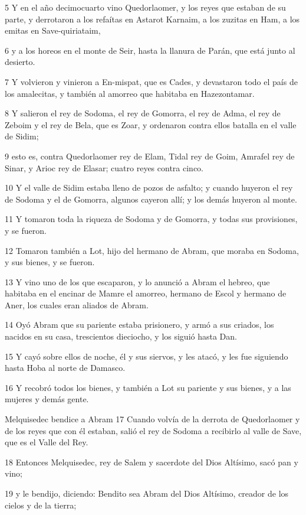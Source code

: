 5 Y en el año decimocuarto vino Quedorlaomer, y los reyes que estaban de su parte, y derrotaron a los refaítas en Astarot Karnaim, a los zuzitas en Ham, a los emitas en Save-quiriataim,

6 y a los horeos en el monte de Seir, hasta la llanura de Parán, que está junto al desierto.

7 Y volvieron y vinieron a En-mispat, que es Cades, y devastaron todo el país de los amalecitas, y también al amorreo que habitaba en Hazezontamar.

8 Y salieron el rey de Sodoma, el rey de Gomorra, el rey de Adma, el rey de Zeboim y el rey de Bela, que es Zoar, y ordenaron contra ellos batalla en el valle de Sidim;

9 esto es, contra Quedorlaomer rey de Elam, Tidal rey de Goim, Amrafel rey de Sinar, y Arioc rey de Elasar; cuatro reyes contra cinco.

10 Y el valle de Sidim estaba lleno de pozos de asfalto; y cuando huyeron el rey de Sodoma y el de Gomorra, algunos cayeron allí; y los demás huyeron al monte.

11 Y tomaron toda la riqueza de Sodoma y de Gomorra, y todas sus provisiones, y se fueron.

12 Tomaron también a Lot, hijo del hermano de Abram, que moraba en Sodoma, y sus bienes, y se fueron.

13 Y vino uno de los que escaparon, y lo anunció a Abram el hebreo, que habitaba en el encinar de Mamre el amorreo, hermano de Escol y hermano de Aner, los cuales eran aliados de Abram.

14 Oyó Abram que su pariente estaba prisionero, y armó a sus criados, los nacidos en su casa, trescientos dieciocho, y los siguió hasta Dan.

15 Y cayó sobre ellos de noche, él y sus siervos, y les atacó, y les fue siguiendo hasta Hoba al norte de Damasco.

16 Y recobró todos los bienes, y también a Lot su pariente y sus bienes, y a las mujeres y demás gente.

Melquisedec bendice a Abram
17 Cuando volvía de la derrota de Quedorlaomer y de los reyes que con él estaban, salió el rey de Sodoma a recibirlo al valle de Save, que es el Valle del Rey.

18 Entonces Melquisedec, rey de Salem y sacerdote del Dios Altísimo, sacó pan y vino;

19 y le bendijo, diciendo: Bendito sea Abram del Dios Altísimo, creador de los cielos y de la tierra;

